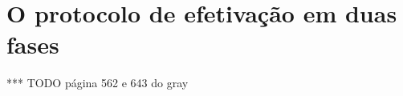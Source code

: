 \documentclass[11pt,twoside,a4paper]{book}
\begin{document}





\section{O protocolo de efetivação em duas fases}
\label{sec:2pc}
*** TODO página 562 e 643 do gray 
\end{document}
